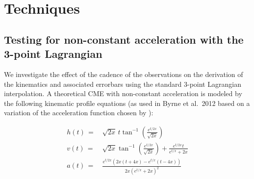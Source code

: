 \documentclass[structabstract]{aa}
\begin{document}
\section{Techniques}

\subsection{Testing for non-constant acceleration with the 3-point Lagrangian}


We investigate the effect of the cadence of the observations on the derivation of the kinematics and associated errorbars using the standard 3-point Lagrangian interpolation. A theoretical CME with non-constant acceleration is modeled by the following kinematic profile equations (as used in Byrne et al.~2012 based on a variation of the acceleration function chosen by \citealt{2003ApJ...588L..53G}):

\begin{eqnarray}
h(t)\,=&\,\sqrt{2x}\,t\tan^{-1}\left(\frac{e^{t/2x}}{\sqrt{2x}}\right) \\
v(t)\,=&\,\sqrt{2x}\tan^{-1}\left(\frac{e^{t/2x}}{\sqrt{2x}}\right)+\frac{e^{t/2x}t}{e^{t/x}+2x} \\
a(t)\,=&\,\frac{e^{t/2x}\left(2x\left(t+4x\right)-e^{t/x}\left(t-4x\right)\right)}{2x\left(e^{t/x}+2x\right)^2}
\end{eqnarray}
\end{document}
